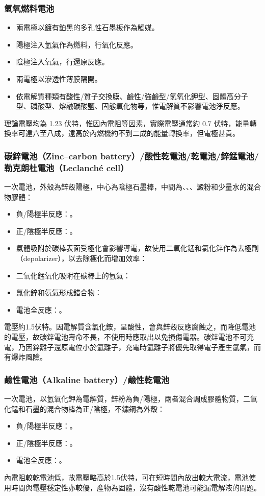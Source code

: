 \documentclass[a4paper,12pt]{report}
\begin{document}
\begin{itemize}
\subsubsection{氫氧燃料電池}
\begin{itemize}
\item 兩電極以鍍有鉑黑的多孔性石墨板作為觸媒。
\item 陽極注入氫氣作為燃料，行氧化反應。
\item 陰極注入氧氣，行還原反應。
\item 兩電極以滲透性薄膜隔開。
\item 依電解質種類有酸性/質子交換膜、鹼性/強鹼型/氫氧化鉀型、固體高分子型、磷酸型、熔融碳酸鹽、固態氧化物等，惟電解質不影響電池淨反應。
\end{itemize}
理論電壓均為 1.23 伏特，惟因內電阻等因素，實際電壓通常約 0.7 伏特，能量轉換率可達六至八成，遠高於內燃機約不到二成的能量轉換率，但電極甚貴。
\subsubsection{碳鋅電池（Zinc–carbon battery）/酸性乾電池/乾電池/鋅錳電池/勒克朗杜電池（Leclanché cell） }
一次電池，外殼為鋅殼陽極，中心為陰極石墨棒，中間為、、、澱粉和少量水的混合物膠體：
\begin{itemize}
\item 負/陽極半反應：。
\item 正/陰極半反應：。
\item 氣體吸附於碳棒表面受極化會影響導電，故使用二氧化錳和氯化鋅作為去極劑（depolarizer），以去除極化而增加效率：
\bit
\item 二氧化錳氧化吸附在碳棒上的氫氣：
\item 氯化鋅和氨氣形成錯合物：
\eit
\item 電池全反應：。
\end{itemize}
電壓約1.5伏特。因電解質含氯化銨，呈酸性，會與鋅殼反應腐蝕之，而降低電池的電壓，故碳鋅電池壽命不長，不使用時應取出以免損傷電器。碳鋅電池不可充電，乃因鋅離子還原電位小於氫離子，充電時氫離子將優先取得電子產生氫氣，而有爆炸風險。
\subsubsection{鹼性電池（Alkaline battery）/鹼性乾電池}
一次電池，以氫氧化鉀為電解質，鋅粉為負/陽極，兩者混合調成膠體物質，二氧化錳和石墨的混合物棒為正/陰極，不鏽鋼為外殼：
\begin{itemize}
\item 負/陽極半反應：。
\item 正/陰極半反應：。
\item 電池全反應：。
\end{itemize}
內電阻較乾電池低，故電壓略高於1.5伏特，可在短時間內放出較大電流，電池使用時間與電壓穩定性亦較優，產物為固體，沒有酸性乾電池可能漏電解液的問題。

\end{itemize}
\end{document}
